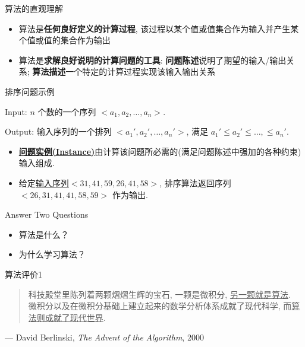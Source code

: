\documentclass[fontset=fandol,UTF8,12pt,aspectratio=169,fleqn]{beamer}
\begin{document}
\begin{frame}{算法的直观理解}
\begin{itemize}[<+-|alert@+>]
\item 算法是\textbf{任何良好定义的计算过程}, 该过程以某个值或值集合作为输入并产生某个值或值的集合作为输出  
\item 算法是\textbf{求解良好说明的计算问题的工具}:  \textbf{问题陈述}说明了期望的输入/输出关系; \textbf{算法描述}一个特定的计算过程实现该输入输出关系
\end{itemize}
\end{frame}

\begin{frame}{排序问题示例}
  \begin{definition}[排序问题]

Input: $n$ 个数的一个序列 $<a_1, a_2, \ldots, a_n>$.  

Output: 输入序列的一个排列 $<a_1', a_2',\ldots, a_n'>$, 满足 $a_1'\leq
a_2'\leq \ldots, \leq a_n'$.  
\end{definition}
\begin{itemize}[<+-|alert@+>]
\item \underline{\textbf{问题实例(Instance)}}由计算该问题所必需的(满足问题陈述中强加的各种约束)输入组成.  

\item 给定\underline{输入序列$<31, 41, 59, 26, 41, 58>$}, 排序算法返回序列 $<26, 31, 41, 41, 58,
  59>$ 作为输出.
\end{itemize}
\end{frame}

\begin{frame}{Answer Two Questions}
\begin{itemize}[<+-|alert@+>]
\item 算法是什么？
\item 为什么学习算法？
\end{itemize}
\end{frame}

\begin{frame}  {算法评价1}
\begin{quote}
科技殿堂里陈列着两颗熠熠生辉的宝石, 一颗是微积分, \underline{另一颗就是算法}. \\

微积分以及在微积分基础上建立起来的数学分析体系成就了现代科学, 而\underline{算法则成就了现代世界}. 
\end{quote}
\begin{center}
  --- David Berlinski, \emph{The Advent of the Algorithm}, 2000
\end{center}
\end{frame}
\end{document}
